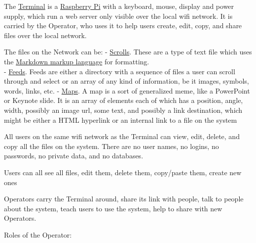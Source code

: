 The \href{scrolls/terminal.md}{Terminal} is a
\href{https://www.raspberrypi.org/}{Raspberry Pi} with a keyboard,
mouse, display and power supply, which run a web server only visible
over the local wifi network. It is carried by the Operator, who uses it
to help users create, edit, copy, and share files over the local
network.

The files on the Network can be: - \href{scrolls/scrolls.md}{Scrolls}.
These are a type of text file which uses the
\href{https://daringfireball.net/projects/markdown/}{Markdown markup
language} for formatting.\\
- \href{scrolls/feeds.md}{Feeds}. Feeds are either a directory with a
sequence of files a user can scroll through and select or an array of
any kind of information, be it images, symbols, words, links, etc. -
\href{scrolls/maps.md}{Maps}. A map is a sort of generalized meme, like
a PowerPoint or Keynote slide. It is an array of elements each of which
has a position, angle, width, possibly an image url, some text, and
possibly a link destination, which might be either a HTML hyperlink or
an internal link to a file on the system

All users on the same wifi network as the Terminal can view, edit,
delete, and copy all the files on the system. There are no user names,
no logins, no passwords, no private data, and no databases.

Users can all see all files, edit them, delete them, copy/paste them,
create new ones

Operators carry the Terminal around, share its link with people, talk to
people about the system, teach users to use the system, help to share
with new Operators.

Roles of the Operator:

